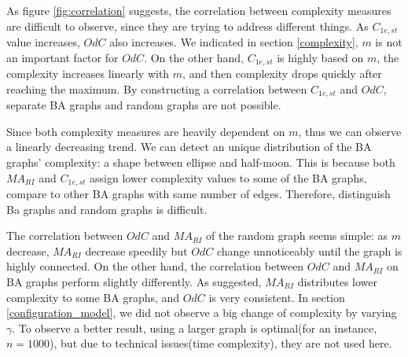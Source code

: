 \documentclass[12pt]{article}
\begin{document}
\noindent
As figure \ref{fig:correlation} suggests, the correlation between complexity measures are difficult to observe, since they are trying to address different things. As $C_{1e,st}$ value increases, $OdC$ also increases. We indicated in section \ref{complexity}, $m$ is not an important factor for $OdC$. On the other hand, $C_{1e,st}$ is highly based on $m$, the complexity increases linearly with $m$, and then complexity drops quickly after reaching the maximum. By constructing a correlation between $C_{1e,st}$ and $OdC$, separate BA graphs and random graphs are not possible.\par
Since both complexity measures are heavily dependent on $m$, thus we can observe a linearly decreasing trend. We can detect an unique distribution of the BA graphs' complexity: a shape between ellipse and half-moon. This is because both $MA_{RI}$ and $C_{1e,st}$ assign lower complexity values to some of the BA graphs, compare to other BA graphs with same number of edges. Therefore, distinguish Ba graphs and random graphs is difficult.\par
The correlation between $OdC$ and $MA_{RI}$ of the random graph seems simple: as $m$ decrease, $MA_{RI}$ decrease speedily but $OdC$ change unnoticeably until the graph is highly connected. On the other hand, the correlation between $OdC$ and $MA_{RI}$ on BA graphs perform slightly differently. As suggested, $MA_{RI}$ distributes lower complexity to some BA graphs, and $OdC$ is very consistent. In section \ref{configuration_model}, we did not observe a big change of complexity by varying $\gamma$. To observe a better result, using a larger graph is optimal(for an instance, $n=1000$), but due to technical issues(time complexity), they are not used here.
\end{document}
